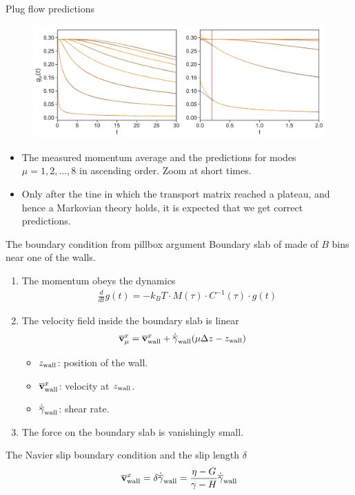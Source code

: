 \documentclass{beamer}
\newcommand{\esc}{\!\cdot\!}
\begin{document}
\begin{frame}{Plug flow predictions}
\begin{figure}[!h]
\includegraphics[width=\linewidth]{gxtPredictions-17nodes-WALLS-defense2}
\end{figure}
  \begin{itemize}
    \item The {\color{blue} measured momentum average} and the {\color{orange} predictions} for modes $\mu=1, 2,...,8$ in ascending order. Zoom at short times.
    \item Only after the tine in which the transport matrix reached a plateau, and hence a Markovian theory holds, it is expected that we get correct predictions. 
  \end{itemize}
\end{frame}

\begin{frame}{The boundary condition from pillbox argument}
Boundary slab of made of $B$ bins near one of the walls.
  \begin{enumerate}
    \item The momentum obeys the dynamics
      \begin{align}
        \frac{d}{dt}g(t)=-k_BT\esc M(\tau)\esc C^{-1}(\tau)\esc g(t)
        \nonumber
      \end{align}
\item The velocity field inside the boundary slab is linear
\begin{align}
\overline{\bf v}^x_{\mu}&=  \overline{\bf v}^x_{\rm wall}+\dot{\overline{\gamma}}_{\rm wall}(\mu\Delta z-z_{\rm wall})
\nonumber
\end{align}
      \begin{itemize}
        \item $z_{\rm wall}$: position of the wall. 
        \item $\overline{\bf v}^x_{\rm wall}$: velocity at $z_{\rm wall}$.
        \item $\dot{\overline{\gamma}}_{\rm wall}$: shear rate.
      \end{itemize}
\item The force on the boundary slab is vanishingly small. 
  \end{enumerate}
The Navier slip boundary condition and the slip length $\delta$
\begin{align}
\overline{\bf v}^x_{\rm wall}=\delta\dot{\overline{\gamma}}_{\rm wall}
  =\frac{\eta-G}{\gamma-H}\dot{\overline{\gamma}}_{\rm wall}
  \nonumber
\end{align}
\end{frame}
\end{document}
